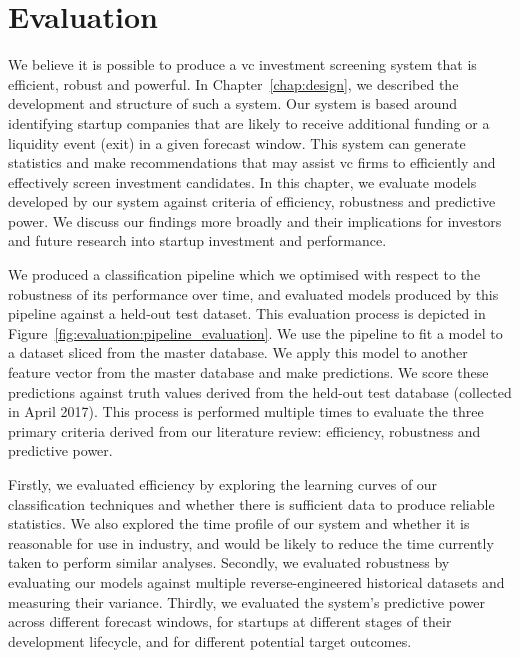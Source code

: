 \documentclass[../thesis/thesis.tex]{subfiles}
\begin{document}
\chapter{Evaluation}
\label{chap:evaluation}

We believe it is possible to produce a \gls{vc} investment screening system that is efficient, robust and powerful. In Chapter~\ref{chap:design}, we described the development and structure of such a system. Our system is based around identifying startup companies that are likely to receive additional funding or a liquidity event (exit) in a given forecast window. This system can generate statistics and make recommendations that may assist \gls{vc} firms to efficiently and effectively screen investment candidates. In this chapter, we evaluate models developed by our system against criteria of efficiency, robustness and predictive power. We discuss our findings more broadly and their implications for investors and future research into startup investment and performance.

We produced a classification pipeline which we optimised with respect to the robustness of its performance over time, and evaluated models produced by this pipeline against a held-out test dataset. This evaluation process is depicted in Figure~\ref{fig:evaluation:pipeline_evaluation}. We use the pipeline to fit a model to a dataset sliced from the master database. We apply this model to another feature vector from the master database and make predictions. We score these predictions against truth values derived from the held-out test database (collected in April 2017). This process is performed multiple times to evaluate the three primary criteria derived from our literature review: efficiency, robustness and predictive power.

Firstly, we evaluated efficiency by exploring the learning curves of our classification techniques and whether there is sufficient data to produce reliable statistics. We also explored the time profile of our system and whether it is reasonable for use in industry, and would be likely to reduce the time currently taken to perform similar analyses. Secondly, we evaluated robustness by evaluating our models against multiple reverse-engineered historical datasets and measuring their variance. Thirdly, we evaluated the system's predictive power across different forecast windows, for startups at different stages of their development lifecycle, and for different potential target outcomes.
\end{document}
